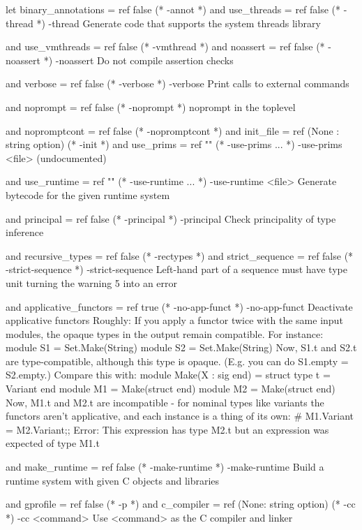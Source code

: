 \begin{bashcode}
let binary_annotations = ref false      (* -annot *)
and use_threads = ref false             (* -thread *)
-thread  Generate code that supports the system threads library

and use_vmthreads = ref false           (* -vmthread *)
and noassert = ref false                (* -noassert *)
-noassert  Do not compile assertion checks

and verbose = ref false                 (* -verbose *)
-verbose  Print calls to external commands

and noprompt = ref false                (* -noprompt *)
noprompt in the toplevel

and nopromptcont = ref false            (* -nopromptcont *)
and init_file = ref (None : string option)   (* -init *)
and use_prims = ref ""                  (* -use-prims ... *)
-use-prims <file>  (undocumented)

and use_runtime = ref ""                (* -use-runtime ... *)
-use-runtime <file>  Generate bytecode for the given runtime system

and principal = ref false               (* -principal *)
-principal  Check principality of type inference

and recursive_types = ref false         (* -rectypes *)
and strict_sequence = ref false         (* -strict-sequence *)
-strict-sequence  Left-hand part of a sequence must have type unit
turning the warning 5 into an error


and applicative_functors = ref true     (* -no-app-funct *)
-no-app-funct  Deactivate applicative functors
Roughly: If you apply a functor twice with the same input modules, the
opaque types in the output remain compatible. For instance:
module S1 = Set.Make(String)
module S2 = Set.Make(String)
Now, S1.t and S2.t are type-compatible, although this type is opaque.
(E.g. you can do S1.empty = S2.empty.)
Compare this with:
module Make(X : sig end) = struct type t = Variant end
module M1 = Make(struct end)
module M2 = Make(struct end)
Now, M1.t and M2.t are incompatible - for nominal types like variants
the functors aren't applicative, and each instance is a thing of its
own:
# M1.Variant = M2.Variant;;
Error: This expression has type M2.t but an expression was expected of
type M1.t


and make_runtime = ref false            (* -make-runtime *)
-make-runtime  Build a runtime system with given C objects and libraries

and gprofile = ref false                (* -p *)
and c_compiler = ref (None: string option) (* -cc *)
-cc <command>  Use <command> as the C compiler and linker


\end{bashcode}

